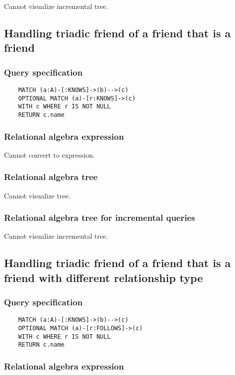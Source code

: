 	Cannot visualize incremental tree.
	\subsection{Handling triadic friend of a friend that is a friend}

	\subsubsection*{Query specification}

	\begin{lstlisting}
	MATCH (a:A)-[:KNOWS]->(b)-->(c)
	OPTIONAL MATCH (a)-[r:KNOWS]->(c)
	WITH c WHERE r IS NOT NULL
	RETURN c.name
	\end{lstlisting}


	\subsubsection*{Relational algebra expression}

	Cannot convert to expression.

	\subsubsection*{Relational algebra tree}

	Cannot visualize tree.

	\subsubsection*{Relational algebra tree for incremental queries}

	Cannot visualize incremental tree.
	\subsection{Handling triadic friend of a friend that is a friend with different relationship type}

	\subsubsection*{Query specification}

	\begin{lstlisting}
	MATCH (a:A)-[:KNOWS]->(b)-->(c)
	OPTIONAL MATCH (a)-[r:FOLLOWS]->(c)
	WITH c WHERE r IS NOT NULL
	RETURN c.name
	\end{lstlisting}


	\subsubsection*{Relational algebra expression}

